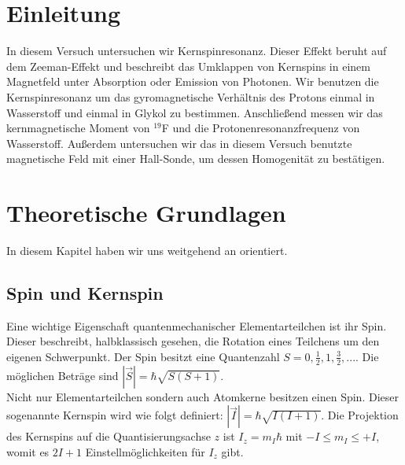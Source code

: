 \documentclass[12pt]{article}
\title{\vspace{0cm}{\Huge Fortgeschrittenen-Praktikum I:\\ \vspace{1cm} Kernspinresonanz}}
\author{Saskia Bondza\\Simon Stephan}
\date{durchgeführt am 15.09.2016}
\begin{document}
\maketitle
\newpage

\thispagestyle{empty}
\tableofcontents
\newpage

\section{Einleitung}

In diesem Versuch untersuchen wir Kernspinresonanz. Dieser Effekt beruht auf dem Zeeman-Effekt und beschreibt das Umklappen von Kernspins in einem Magnetfeld unter Absorption oder Emission von Photonen. Wir benutzen die Kernspinresonanz um das gyromagnetische Verhältnis des Protons einmal in Wasserstoff und einmal in Glykol zu bestimmen. Anschließend messen wir das kernmagnetische Moment von $^{19}$F und die Protonenresonanzfrequenz von Wasserstoff. Außerdem untersuchen wir das in diesem Versuch benutzte magnetische Feld mit einer Hall-Sonde, um dessen Homogenität zu bestätigen.


\newpage
\section{Theoretische Grundlagen}
In diesem Kapitel haben wir uns weitgehend an \cite{anleitung} orientiert.
\subsection{Spin und Kernspin}\label{CURVEFEVER3SUCKS}
Eine wichtige Eigenschaft quantenmechanischer Elementarteilchen ist ihr Spin. Dieser beschreibt, halbklassisch gesehen, die Rotation eines Teilchens um den eigenen Schwerpunkt. Der Spin besitzt eine Quantenzahl $S=0,\frac12,1,\frac32,...$. Die möglichen Beträge sind $|\vec S|=\hbar\sqrt{S(S+1)}$.\\

Nicht nur Elementarteilchen sondern auch Atomkerne besitzen einen Spin. Dieser sogenannte Kernspin wird wie folgt definiert: $|\vec I|=\hbar\sqrt{I(I+1)}$. Die Projektion des Kernspins auf die Quantisierungsachse $z$ ist $I_z=m_I\hbar$ mit $-I\leq m_I\leq +I$, womit es $2I+1$ Einstellmöglichkeiten für $I_z$ gibt.\\
\end{document}
